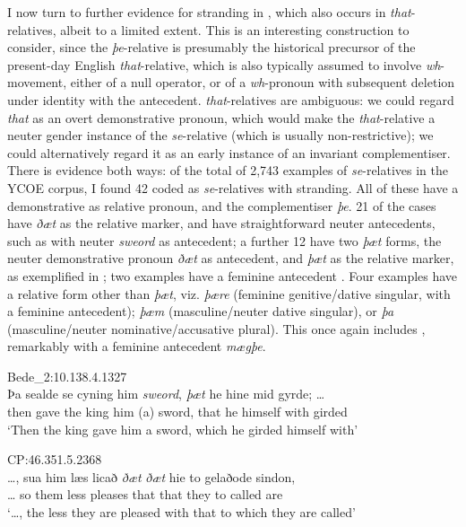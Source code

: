 \documentclass[output=paper]{langsci/langscibook}
\begin{document}
I now turn to further evidence for stranding in , which also occurs
in \textit{that}-relatives, albeit to a limited extent. This is an interesting
construction to consider, since the \textit{þe}-relative is presumably the
historical precursor of the present-day English \textit{that}-relative, which
is also typically assumed to involve \textit{wh}-movement, either of a null
operator, or of a \textit{wh}-pronoun with subsequent deletion under identity
with the antecedent.  \textit{that}-relatives are ambiguous: we
could regard \textit{that} as an overt demonstrative pronoun, which would make
the \textit{that}-relative a neuter gender instance of the \textit{se}-relative
(which is usually non-restrictive); we could alternatively regard it as an
early instance of an invariant complementiser. There is evidence both ways: of
the total of 2,743 examples of \textit{se}-relatives in the YCOE corpus, I
found 42 coded as \textit{se}-relatives with stranding. All of these have a
demonstrative as relative pronoun, and the complementiser \textit{þe}.  21 of
the cases have \textit{ðæt} as the relative marker, and have straightforward
neuter antecedents, such as  with neuter \textit{sweord} as
antecedent; a further 12 have two \textit{þæt} forms, the neuter demonstrative
pronoun \textit{ðæt} as antecedent, and \textit{þæt} as the relative marker, as
exemplified in ; two examples have a feminine antecedent
. Four examples have a relative form other than \textit{þæt},
viz.  \textit{þære} (feminine genitive/dative singular, with a feminine
antecedent); \textit{þæm} (masculine/neuter dative singular), or \textit{þa}
(masculine/neuter nominative/accusative plural). This once again includes
, remarkably with a feminine antecedent
\textit{mægþe}.

\ea Bede\_2:10.138.4.1327%
    \label{ex:key:11.9b}\\
    \gll  Þa     sealde se  cyning him  {}    \textit{sweord}, \textit{þæt} he hine      mid  gyrde; …  \\
        then gave   the king    him (a) sword,   that he himself with girded\\
    \glt ‘Then the king gave him a sword, which he girded himself with’
\z

\ea CP:46.351.5.2368%
    \label{ex:key:11.10}\\
    \gll …, sua him læs    licað    \textit{ðæt} \textit{ðæt} hie  to   gelaðode sindon, \\
        …  so   them less pleases that that they to called      are\\
    \glt `…, the less they are pleased with that to which they are called’
\z
\end{document}
